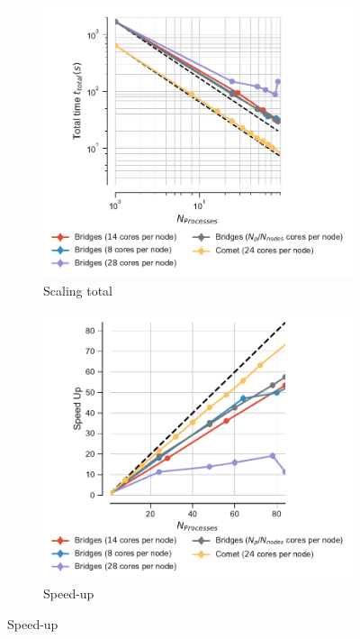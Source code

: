 \label{sec:clusters}

\begin{figure}[ht!]
\centering
\begin{subfigure}{.4\textwidth}
  \includegraphics[width=\linewidth]{figures/Comparison_t-tot-clusters.pdf}
  \caption{Scaling total}
  \label{fig:MPIscaling-clusters}
\end{subfigure}
\hfill
\begin{subfigure}{.4\textwidth}
  \includegraphics[width=\linewidth]{figures/Comparison_speed-up-clusters.pdf}
  \caption{Speed-up}
  \label{fig:MPIspeedup-clusters}
\end{subfigure}
\bigskip


\end{figure}

